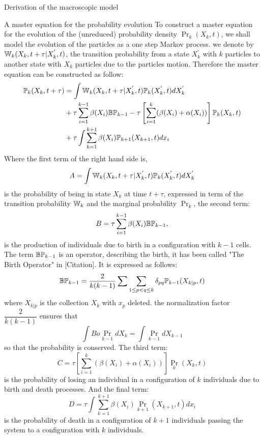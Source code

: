 \begin{paragraph}{Derivation of the macroscopic model}
\begin{paragraph}{A master equation for the probability evolution}
To construct a master equation for the evolution of the (unreduced) probability density $\Pr_k(X_k,t)$, we shall model the evolution of the particles as a one step Markov process. 
we denote by ${\mathbb{W}}_k(X_k, t+\tau \vert X_k^{'},t)$, the transition probability from a state $X_k^{'}$ with $k$ particles to another state with $X_k$ particles due to the particles motion. Therefore the master equation can be constructed as follow:
\begin{align}
\label{masterEquation}
{\mathbb{P}}_k(X_k, t+\tau) &= \int {\mathbb{W}}_k(X_k, t+\tau \vert X_k^{'},t){\mathbb{P}}_k( X_k^{'},t)d X_k^{'} \nonumber \\ 
&+ \tau \sum_{i=1}^{k-1}\beta(X_i) {\mathbb{B}} {\mathbb{P}}_{k-1} - \tau \left[ \sum_{i=1}^{k} (\beta(X_i) + \alpha(X_i)) \right] {\mathbb{P}}_k(X_k,t) \\ 
&+ \tau \int \sum_{k=1}^{k+1} \beta(X_i) {\mathbb{P}}_{k+1}(X_{k+1}, t)dx_i \nonumber
\end{align}
Where the first term of the right hand side is, 
$$ A = \int {\mathbb{W}}_k(X_k, t+\tau \vert X_k^{'},t){\mathbb{P}}_k( X_k^{'},t)d X_k^{'}$$
is the probability of being in state $X_k$ at time $t+\tau$, expressed in term of the transition probability ${\mathbb{W}}_k$ and the marginal probability $\Pr_k$, the second term: 
$$B = \tau \sum_{i=1}^{k-1}\beta(X_i) {\mathbb{B}} {\mathbb{P}}_{k-1},$$ 
is the production of individuals due to birth in a configuration with $k-1$ cells. The term ${\mathbb{B}} {\mathbb{P}}_{k-1}$ is an operator, describing the birth, it has been called "The Birth Operator" in [Citation]. It is expressed as follows: 
\begin{equation}
\label{birthOperator}
{\mathbb{B}} {\mathbb{P}}_{k-1} = \dfrac{2}{k(k-1)} \sum \sum_{1 \leq p < q \leq k} \delta_{pq} {\mathbb{P}}_{k-1} (X_{k|p},t) 
\end{equation}
where $X_{k|p}$ is the collection $X_k$ with $x_p$ deleted. the normalization  factor $\dfrac{2}{k(k-1)}$ ensures that
\begin{equation}
\int Bo \Pr_{k-1} dX_k = \int \Pr_{k-1} dX_{k-1}
\end{equation}
so that the probability is conserved. The third term:
$$C=  \tau \left[ \sum_{i=1}^{k} (\beta(X_i) + \alpha(X_i)) \right] \Pr_k(X_k,t)$$
is the probability of losing an individual in a configuration of $k$ individuals due to birth and death processes. And the final term:
$$D = \tau \int \sum_{k=1}^{k+1} \beta(X_i) \Pr_{k+1}(X_{k+1}, t)dx_i$$ 
is the probability of death in a configuration of $k+1$ individuals passing the system to a configuration with $k$ individuals.


\end{paragraph}
\end{paragraph}
